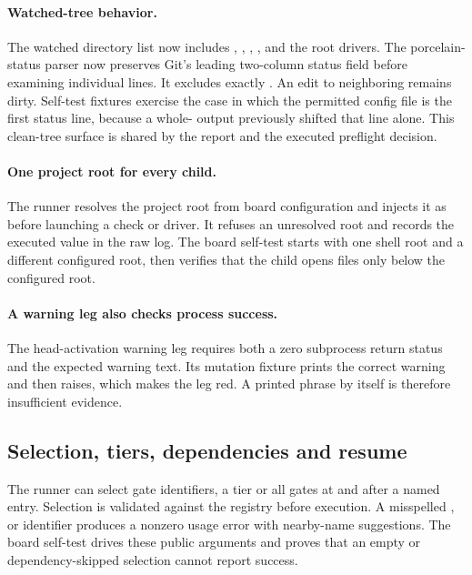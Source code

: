 \paragraph{Watched-tree behavior.}
The watched directory list now includes , ,
, ,  and the
root drivers.  The porcelain-status parser now preserves Git's leading
two-column status field before examining individual lines.  It excludes
exactly .  An edit to neighboring
 remains dirty.  Self-test fixtures exercise the case in
which the permitted config file is the first status line, because a whole-
output  previously shifted that line alone.  This clean-tree
surface is shared by the report and the executed preflight decision.

\paragraph{One project root for every child.}
The runner resolves the project root from board configuration and injects it
as  before launching a check or driver.  It refuses an unresolved
root and records the executed value in the raw log.  The board self-test starts
with one shell root and a different configured root, then verifies that the
child opens files only below the configured root.

\paragraph{A warning leg also checks process success.}
The head-activation warning leg requires both a zero subprocess return status
and the expected warning text.  Its mutation fixture prints the correct
warning and then raises, which makes the leg red.  A printed phrase by itself
is therefore insufficient evidence.

\subsection{Selection, tiers, dependencies and resume}

The runner can select gate identifiers, a tier or all gates at and after a
named entry.  Selection is validated against the registry before execution.
A misspelled ,  or 
identifier produces a nonzero usage error with nearby-name suggestions.  The
board self-test drives these public arguments and proves that an empty or
dependency-skipped selection cannot report success.

